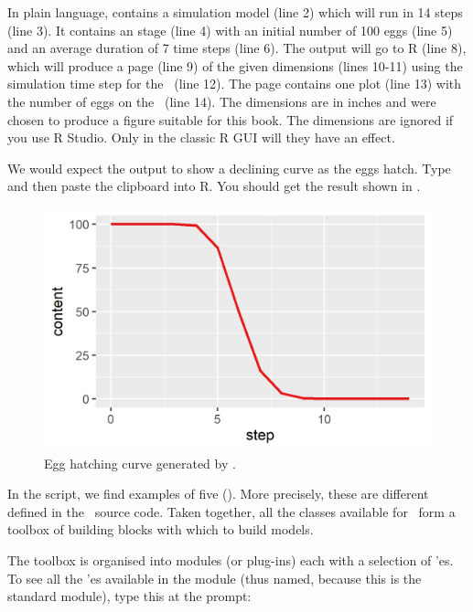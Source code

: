 In plain language,  contains a simulation model (line 2) which will run in 14 steps (line 3). It contains an  stage (line 4) with an initial number of 100 eggs (line 5) and an average duration of 7 time steps (line 6). The output will go to R (line 8), which will produce a page (line 9) of the given dimensions (lines 10-11) using the simulation time step for the \xaxis\ (line 12). The page contains one plot (line 13) with the number of eggs on the \yaxis\ (line 14). The dimensions are in inches and were chosen to produce a figure suitable for this book. The dimensions are ignored if you use R Studio. Only in the classic R GUI will they have an effect.

We would expect the output to show a declining curve as the eggs hatch. Type  and then paste the clipboard into R. You should get the result shown in .

\begin{figure} [b]
\centering
\includegraphics{graphics/egg1}
\caption{Egg hatching curve generated by .}
\label{fig:egg1}
\end{figure}

In the  script, we find examples of five  (). More precisely, these are different  defined in the \CPP\ source code. Taken together, all the  classes available for \US\ form a toolbox of building blocks with which to build models. 

The toolbox is organised into modules (or plug-ins) each with a selection of 'es. To see all the 'es available in the  module (thus named, because this is the standard module), type this at the prompt:


